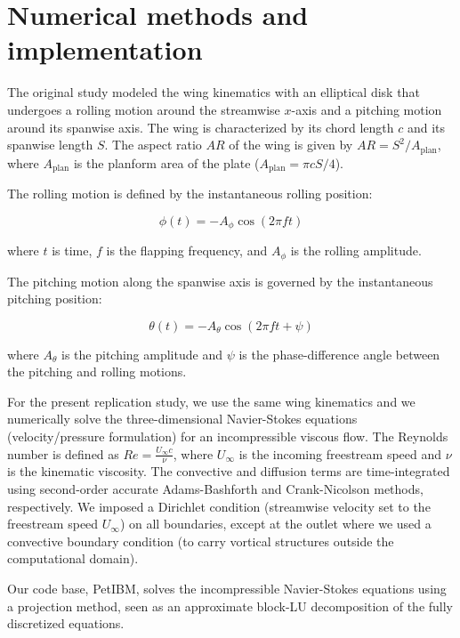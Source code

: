 \section{Numerical methods and implementation}

The original study modeled the wing kinematics with an elliptical disk that undergoes a rolling motion around the streamwise $x$-axis and a pitching motion around its spanwise axis.
The wing is characterized by its chord length $c$ and its spanwise length $S$.
The aspect ratio $AR$ of the wing is given by $AR = S^2 / A_\text{plan}$, where $A_\text{plan}$ is the planform area of the plate ($A_\text{plan} = \pi c S / 4$).

The rolling motion is defined by the instantaneous rolling position:

\begin{equation}
  \phi (t) = -A_\phi \cos \left( 2 \pi f t \right)
\end{equation}

where $t$ is time, $f$ is the flapping frequency, and $A_\phi$ is the rolling amplitude.

The pitching motion along the spanwise axis is governed by the instantaneous pitching position:

\begin{equation}
  \theta (t) = -A_\theta \cos(2 \pi f t + \psi)
\end{equation}

where $A_\theta$ is the pitching amplitude and $\psi$ is the phase-difference angle between the pitching and rolling motions.

For the present replication study, we use the same wing kinematics and we numerically solve the three-dimensional Navier-Stokes equations (velocity/pressure formulation) for an incompressible viscous flow.
The Reynolds number is defined as $Re = \frac{U_\infty c}{\nu}$, where $U_\infty$ is the incoming freestream speed and $\nu$ is the kinematic viscosity.
The convective and diffusion terms are time-integrated using second-order accurate Adams-Bashforth and Crank-Nicolson methods, respectively.
We imposed a Dirichlet condition (streamwise velocity set to the freestream speed $U_\infty$) on all boundaries, except at the outlet where we used a convective boundary condition (to carry vortical structures outside the computational domain).

Our code base, PetIBM, solves the incompressible Navier-Stokes equations using a projection method, seen as an approximate block-LU decomposition of the fully discretized equations.\supercite{perot_1993}

